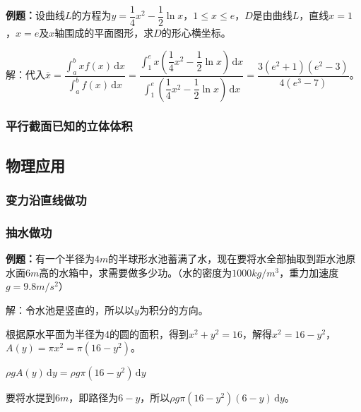 \documentclass[UTF8, 12pt]{ctexart}
\begin{document}


\textbf{例题：}设曲线$L$的方程为$y=\dfrac{1}{4}x^2-\dfrac{1}{2}\ln x$，$1\leqslant x\leqslant e$，$D$是由曲线$L$，直线$x=1$，$x=e$及$x$轴围成的平面图形，求$D$的形心横坐标。

解：代入$\overline{x}=\dfrac{\int_a^bxf(x)\,\textrm{d}x}{\int_a^bf(x)\,\textrm{d}x}=\dfrac{\int_1^ex\left(\dfrac{1}{4}x^2-\dfrac{1}{2}\ln x\right)\,\textrm{d}x}{\int_1^e\left(\dfrac{1}{4}x^2-\dfrac{1}{2}\ln x\right)\,\textrm{d}x}=\dfrac{3(e^2+1)(e^2-3)}{4(e^3-7)}$。

\subsubsection{平行截面已知的立体体积}

\subsection{物理应用}

\subsubsection{变力沿直线做功}

\subsubsection{抽水做功}

\textbf{例题：}有一个半径为$4m$的半球形水池蓄满了水，现在要将水全部抽取到距水池原水面$6m$高的水箱中，求需要做多少功。（水的密度为$1000kg/m^3$，重力加速度$g=9.8m/s^2$）

解：令水池是竖直的，所以以$y$为积分的方向。

根据原水平面为半径为4的圆的面积，得到$x^2+y^2=16$，解得$x^2=16-y^2$，$A(y)=\pi x^2=\pi(16-y^2)$。

$\rho gA(y)\,\textrm{d}y=\rho g\pi(16-y^2)\,\textrm{d}y$

要将水提到$6m$，即路径为$6-y$，所以$\rho g\pi(16-y^2)(6-y)\,\textrm{d}y$。
\end{document}

